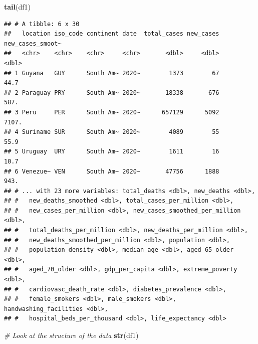 \documentclass[
]{article}
\newenvironment{Shaded}{\begin{snugshade}}{\end{snugshade}}
\newcommand{\CommentTok}[1]{\textcolor[rgb]{0.56,0.35,0.01}{\textit{#1}}}
\newcommand{\KeywordTok}[1]{\textcolor[rgb]{0.13,0.29,0.53}{\textbf{#1}}}
\newcommand{\NormalTok}[1]{#1}
\begin{document}
\begin{Shaded}
\begin{Highlighting}[]
\KeywordTok{tail}\NormalTok{(df1)}
\end{Highlighting}
\end{Shaded}

\begin{verbatim}
## # A tibble: 6 x 30
##   location iso_code continent date  total_cases new_cases new_cases_smoot~
##   <chr>    <chr>    <chr>     <chr>       <dbl>     <dbl>            <dbl>
## 1 Guyana   GUY      South Am~ 2020~        1373        67             44.7
## 2 Paraguay PRY      South Am~ 2020~       18338       676            587. 
## 3 Peru     PER      South Am~ 2020~      657129      5092           7107. 
## 4 Suriname SUR      South Am~ 2020~        4089        55             55.9
## 5 Uruguay  URY      South Am~ 2020~        1611        16             10.7
## 6 Venezue~ VEN      South Am~ 2020~       47756      1888            943. 
## # ... with 23 more variables: total_deaths <dbl>, new_deaths <dbl>,
## #   new_deaths_smoothed <dbl>, total_cases_per_million <dbl>,
## #   new_cases_per_million <dbl>, new_cases_smoothed_per_million <dbl>,
## #   total_deaths_per_million <dbl>, new_deaths_per_million <dbl>,
## #   new_deaths_smoothed_per_million <dbl>, population <dbl>,
## #   population_density <dbl>, median_age <dbl>, aged_65_older <dbl>,
## #   aged_70_older <dbl>, gdp_per_capita <dbl>, extreme_poverty <dbl>,
## #   cardiovasc_death_rate <dbl>, diabetes_prevalence <dbl>,
## #   female_smokers <dbl>, male_smokers <dbl>, handwashing_facilities <dbl>,
## #   hospital_beds_per_thousand <dbl>, life_expectancy <dbl>
\end{verbatim}

\begin{Shaded}
\begin{Highlighting}[]
\CommentTok{# Look at the structure of the data}
\KeywordTok{str}\NormalTok{(df1)}
\end{Highlighting}
\end{Shaded}
\end{document}
